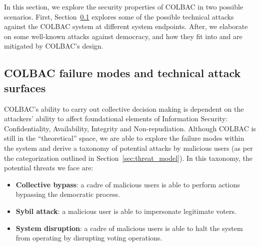In this section, we explore the security properties of COLBAC in two possible
scenarios.  First, Section~\ref{sec:technical} explores some of the possible
technical attacks against the COLBAC system at different system endpoints.
After, we elaborate on some well-known attacks against democracy, and how they
fit into and are mitigated by COLBAC's design.


\subsection{COLBAC failure modes and technical attack surfaces}
\label{sec:technical}
COLBAC's ability to carry out collective decision making is dependent on the
attackers' ability to affect foundational elements of Information Security:
Confidentiality, Availability, Integrity and Non-repudiation. Although COLBAC
is still in the ``theoretical'' space, we are able to explore the failure modes
within the system and derive a taxonomy of potential attacks by malicious users
(as per the categorization outlined in Section~\ref{sec:threat_model}). In this
taxonomy, the potential threats we face are:

\begin{itemize}
    \item {\bf Collective bypass}: a cadre of malicious users is able
        to perform actions bypassing the democratic process.

    \item {\bf Sybil attack}: a malicious user is able
        to impersonate legitimate voters.

    \item {\bf System disruption}: a cadre of malicious users is able to halt
        the system from operating by disrupting voting operations.

\end{itemize}

